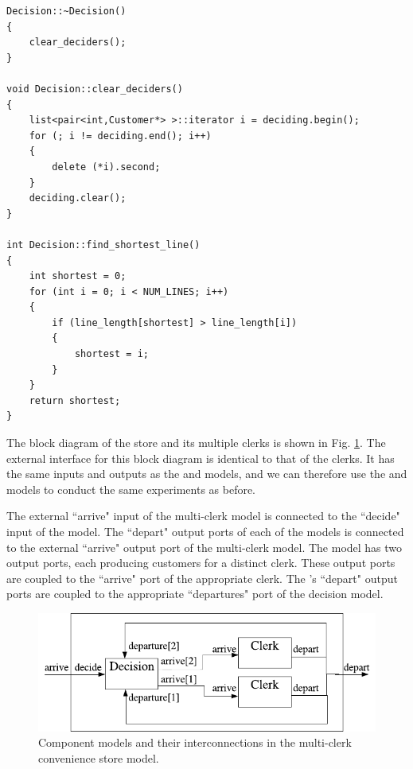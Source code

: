 \begin{verbatim}
Decision::~Decision()
{
    clear_deciders();
}

void Decision::clear_deciders()
{
    list<pair<int,Customer*> >::iterator i = deciding.begin();
    for (; i != deciding.end(); i++)
    {
        delete (*i).second;
    }
    deciding.clear();
}

int Decision::find_shortest_line()
{
    int shortest = 0;
    for (int i = 0; i < NUM_LINES; i++)
    {
        if (line_length[shortest] > line_length[i])
        {
            shortest = i;
        }
    }
    return shortest;
}
\end{verbatim}

The block diagram of the store and its multiple clerks is shown in Fig. \ref{fig:multi_clerk_diagram}. The external interface for this block diagram is identical to that of the clerks. It has the same inputs and outputs as the  and  models, and we can therefore use the  and  models to conduct the same experiments as before.

The external ``arrive" input of the multi-clerk model is connected to the ``decide" input of the  model. The ``depart" output ports of each of the  models is connected to the external ``arrive" output port of the multi-clerk model. The  model has two output ports, each producing customers for a distinct clerk. These output ports are coupled to the ``arrive" port of the appropriate clerk. The 's ``depart" output ports are coupled to the appropriate ``departures" port of the decision model.
\begin{figure}[ht]
\centering
\includegraphics{network_models_figs/multi_clerk_diagram.pdf}
\caption{Component models and their interconnections in the multi-clerk convenience store model.}
\label{fig:multi_clerk_diagram}
\end{figure}    

